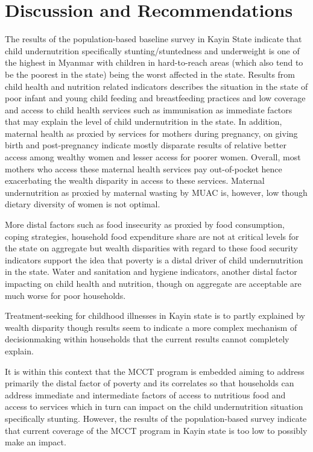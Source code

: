 \documentclass[12pt,a4paper]{article}
\begin{document}
\newpage

\hypertarget{discussion-and-recommendations}{%
\section{Discussion and Recommendations}\label{discussion-and-recommendations}}

The results of the population-based baseline survey in Kayin State indicate that child undernutrition specifically stunting/stuntedness and underweight is one of the highest in Myanmar with children in hard-to-reach areas (which also tend to be the poorest in the state) being the worst affected in the state. Results from child health and nutrition related indicators describes the situation in the state of poor infant and young child feeding and breastfeeding practices and low coverage and access to child health services such as immunisation as immediate factors that may explain the level of child undernutrition in the state. In addition, maternal health as proxied by services for mothers during pregnancy, on giving birth and post-pregnancy indicate mostly disparate results of relative better access among wealthy women and lesser access for poorer women. Overall, most mothers who access these maternal health services pay out-of-pocket hence exacerbating the wealth disparity in access to these services. Maternal undernutrition as proxied by maternal wasting by MUAC is, however, low though dietary diversity of women is not optimal.

More distal factors such as food insecurity as proxied by food consumption, coping strategies, household food expenditure share are not at critical levels for the state on aggregate but wealth disparities with regard to these food security indicators support the idea that poverty is a distal driver of child undernutrition in the state. Water and sanitation and hygiene indicators, another distal factor impacting on child health and nutrition, though on aggregate are acceptable are much worse for poor households.

Treatment-seeking for childhood illnesses in Kayin state is to partly explained by wealth disparity though results seem to indicate a more complex mechanism of decisionmaking within households that the current results cannot completely explain.

It is within this context that the MCCT program is embedded aiming to address primarily the distal factor of poverty and its correlates so that households can address immediate and intermediate factors of access to nutritious food and access to services which in turn can impact on the child undernutrition situation specifically stunting. However, the results of the population-based survey indicate that current coverage of the MCCT program in Kayin state is too low to possibly make an impact.
\end{document}
